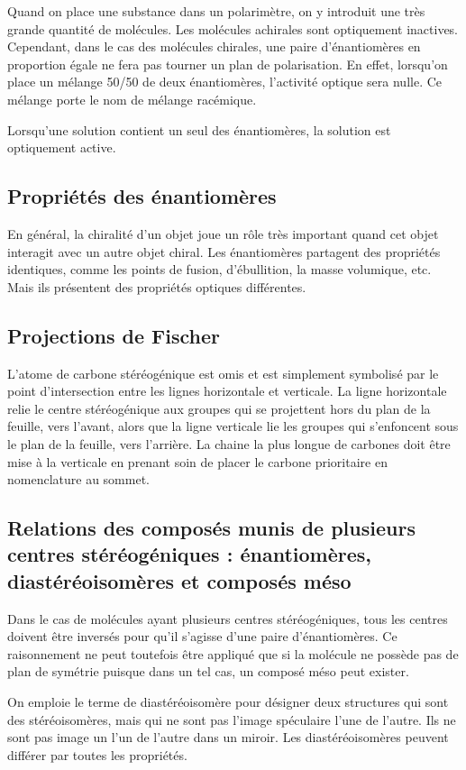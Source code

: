 Quand on place une substance dans un polarimètre, on y introduit une très grande quantité de molécules.
Les molécules achirales sont optiquement inactives.
Cependant, dans le cas des molécules chirales, une paire d'énantiomères en proportion égale ne fera pas tourner un plan de polarisation.
En effet, lorsqu'on place un mélange 50/50 de deux énantiomères, l'activité optique sera nulle.
Ce mélange porte le nom de mélange racémique.

Lorsqu'une solution contient un seul des énantiomères, la solution est optiquement active.

\subsection{Propriétés des énantiomères} En général, la chiralité d'un objet joue un rôle très important quand cet objet interagit avec un autre objet chiral.
Les énantiomères partagent des propriétés identiques, comme les points de fusion, d'ébullition, la masse volumique, etc.
Mais ils présentent des propriétés optiques différentes.

\subsection{Projections de Fischer}
L'atome de carbone stéréogénique est omis et est simplement symbolisé par le point d'intersection entre les lignes horizontale et verticale.
La ligne horizontale relie le centre stéréogénique aux groupes qui se projettent hors du plan de la feuille, vers l'avant, alors que la ligne verticale lie les groupes qui s'enfoncent sous le plan de la feuille, vers l'arrière.
La chaine la plus longue de carbones doit être mise à la verticale en prenant soin de placer le carbone prioritaire en nomenclature au sommet.

\subsection{Relations des composés munis de plusieurs centres stéréogéniques : énantiomères, diastéréoisomères et composés méso} Dans le cas de molécules ayant plusieurs centres stéréogéniques, tous les centres doivent être inversés pour qu'il s'agisse d'une paire d'énantiomères.
Ce raisonnement ne peut toutefois être appliqué que si la molécule ne possède pas de plan de symétrie puisque dans un tel cas, un composé méso peut exister.

On emploie le terme de diastéréoisomère pour désigner deux structures qui sont des stéréoisomères, mais qui ne sont pas l'image spéculaire l'une de l'autre.
Ils ne sont pas image un l'un de l'autre dans un miroir.
Les diastéréoisomères peuvent différer par toutes les propriétés.

